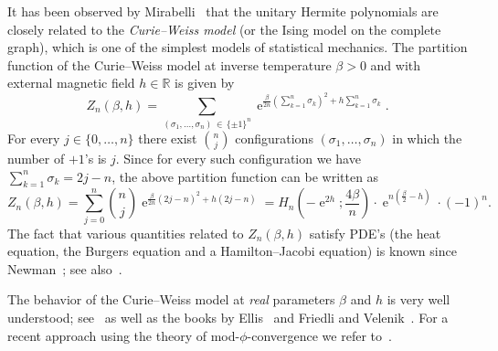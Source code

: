 \documentclass[10pt]{amsart}
\theoremstyle{definition}\newtheorem{defi}[theo]{Definition}\newtheorem{rema}[theo]{Remark}\newtheorem{exam}[theo]{Example}\newtheorem{exem}[theo]{Example}\newtheorem{nota}[theo]{Notation}
\DeclareMathOperator{\eee}{e}
\newcommand{\R}{\mathbb{R}}
\begin{document}
It has been observed by Mirabelli~\cite[Section~3.2.5]{mirabelli_diss} that the unitary Hermite polynomials are closely related to the \emph{Curie--Weiss model} (or the Ising model on the complete graph), which is one of the simplest models of statistical mechanics. The partition function of the Curie--Weiss model at inverse temperature $\beta>0$ and with external magnetic field $h\in \R$ is given by
\begin{equation}\label{eq:curie_weiss_part_funct_def}
Z_n(\beta, h) = \sum_{(\sigma_1,\ldots, \sigma_n)\,\in\,\{\pm 1\}^n} \eee^{\frac {\beta}{2n} \left(\sum\limits_{k=1}^n \sigma_k\right)^2 + h \sum\limits_{k=1}^n \sigma_k}.
\end{equation}
For every $j\in \{0,\ldots,n\}$ there exist $\binom nj$ configurations $(\sigma_1,\ldots, \sigma_n)$ in which the number of $+1$'s is $j$. Since for every such configuration we have $\sum_{k=1}^n \sigma_k = 2j - n$, the above partition function can be written as
\begin{equation}\label{eq:curie_weiss_part_funct_reduction_hermite}
Z_n(\beta, h) =
\sum_{j=0}^n \binom n j \eee^{\frac {\beta}{2n} (2j-n)^2 + h(2j - n)} = H_n \left(-\eee^{2h}; \frac {4\beta}{n}\right) \cdot \eee^{n(\frac \beta 2 - h)} \cdot (-1)^n.
\end{equation}
The fact that various quantities related to $Z_n(\beta, h)$ satisfy PDE's (the heat equation, the Burgers equation and a Hamilton--Jacobi equation) is known since Newman~\cite{newman_perc_theory}; see also~\cite{dominguez_mourrat,dascaliuc}.



The behavior of the Curie--Weiss model at \emph{real} parameters $\beta$ and $h$ is very well understood; see~\cite{ellis_newman,ellis_newman_stat_CW,ellis_newman_rosen} as well as the books by Ellis~\cite[Sections~IV.4, V.9]{ellis_book} and Friedli and Velenik~\cite[Chapter~2]{friedli_velenik_book}. For a recent approach using the theory of mod-$\phi$-convergence we refer to~\cite{meliot_nikeghbali_stat_mech}.
\end{document}
